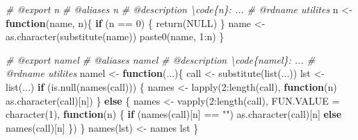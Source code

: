 \documentclass[
]{article}
\newenvironment{Shaded}{\begin{snugshade}}{\end{snugshade}}
\newcommand{\AttributeTok}[1]{\textcolor[rgb]{0.77,0.63,0.00}{#1}}
\newcommand{\CommentTok}[1]{\textcolor[rgb]{0.56,0.35,0.01}{\textit{#1}}}
\newcommand{\ConstantTok}[1]{\textcolor[rgb]{0.00,0.00,0.00}{#1}}
\newcommand{\ControlFlowTok}[1]{\textcolor[rgb]{0.13,0.29,0.53}{\textbf{#1}}}
\newcommand{\DecValTok}[1]{\textcolor[rgb]{0.00,0.00,0.81}{#1}}
\newcommand{\FunctionTok}[1]{\textcolor[rgb]{0.00,0.00,0.00}{#1}}
\newcommand{\NormalTok}[1]{#1}
\newcommand{\OtherTok}[1]{\textcolor[rgb]{0.56,0.35,0.01}{#1}}
\newcommand{\SpecialCharTok}[1]{\textcolor[rgb]{0.00,0.00,0.00}{#1}}
\newcommand{\StringTok}[1]{\textcolor[rgb]{0.31,0.60,0.02}{#1}}
\begin{document}
\begin{Shaded}
\begin{Highlighting}[]
\CommentTok{\#\textquotesingle{} @export n}
\CommentTok{\#\textquotesingle{} @aliases n}
\CommentTok{\#\textquotesingle{} @description \textbackslash{}code\{n\}: ...}
\CommentTok{\#\textquotesingle{} @rdname utilites}
\NormalTok{n }\OtherTok{\textless{}{-}} \ControlFlowTok{function}\NormalTok{(name, n)\{}
  \ControlFlowTok{if}\NormalTok{ (n }\SpecialCharTok{==} \DecValTok{0}\NormalTok{) \{}
    \FunctionTok{return}\NormalTok{(}\ConstantTok{NULL}\NormalTok{)}
\NormalTok{  \}}
\NormalTok{  name }\OtherTok{\textless{}{-}} \FunctionTok{as.character}\NormalTok{(}\FunctionTok{substitute}\NormalTok{(name))}
  \FunctionTok{paste0}\NormalTok{(name, }\DecValTok{1}\SpecialCharTok{:}\NormalTok{n)}
\NormalTok{\}}

\CommentTok{\#\textquotesingle{} @export namel}
\CommentTok{\#\textquotesingle{} @aliases namel}
\CommentTok{\#\textquotesingle{} @description \textbackslash{}code\{namel\}: ...}
\CommentTok{\#\textquotesingle{} @rdname utilites}
\NormalTok{namel }\OtherTok{\textless{}{-}} \ControlFlowTok{function}\NormalTok{(...)\{}
\NormalTok{  call }\OtherTok{\textless{}{-}} \FunctionTok{substitute}\NormalTok{(}\FunctionTok{list}\NormalTok{(...))}
\NormalTok{  lst }\OtherTok{\textless{}{-}} \FunctionTok{list}\NormalTok{(...)}
  \ControlFlowTok{if}\NormalTok{ (}\FunctionTok{is.null}\NormalTok{(}\FunctionTok{names}\NormalTok{(call))) \{}
\NormalTok{    names }\OtherTok{\textless{}{-}} \FunctionTok{lapply}\NormalTok{(}\DecValTok{2}\SpecialCharTok{:}\FunctionTok{length}\NormalTok{(call), }\ControlFlowTok{function}\NormalTok{(n) }\FunctionTok{as.character}\NormalTok{(call)[n])}
\NormalTok{  \} }\ControlFlowTok{else}\NormalTok{ \{}
\NormalTok{    names }\OtherTok{\textless{}{-}} \FunctionTok{vapply}\NormalTok{(}\DecValTok{2}\SpecialCharTok{:}\FunctionTok{length}\NormalTok{(call), }\AttributeTok{FUN.VALUE =} \FunctionTok{character}\NormalTok{(}\DecValTok{1}\NormalTok{),}
                    \ControlFlowTok{function}\NormalTok{(n) \{}
                      \ControlFlowTok{if}\NormalTok{ (}\FunctionTok{names}\NormalTok{(call)[n] }\SpecialCharTok{==} \StringTok{""}\NormalTok{)}
                        \FunctionTok{as.character}\NormalTok{(call)[n]}
                      \ControlFlowTok{else}
                        \FunctionTok{names}\NormalTok{(call)[n]}
\NormalTok{                    \})}
\NormalTok{  \}}
  \FunctionTok{names}\NormalTok{(lst) }\OtherTok{\textless{}{-}}\NormalTok{ names}
\NormalTok{  lst}
\NormalTok{\}}


\end{Highlighting}
\end{Shaded}
\end{document}
